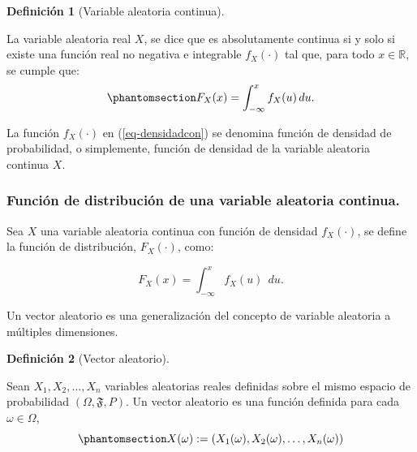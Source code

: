 \documentclass[
  us-letterpaper,
]{scrreprt}
\theoremstyle{plain}
\theoremstyle{definition}
\newtheorem{definition}{Definición}[chapter]
\theoremstyle{definition}
\theoremstyle{remark}
\begin{document}
\begin{definition}[Variable aleatoria
continua]\protect\hypertarget{def-vac}{}\label{def-vac}

La variable aleatoria real \(X\), se dice que es absolutamente continua
si y solo si existe una función real no negativa e integrable
\(f_X(\cdot)\) tal que, para todo \(x \in \mathbb{R}\), se cumple que:
\begin{equation}\phantomsection\label{eq-densidadcon}{
F_X(x) = \int_{-\infty}^{x} f_X(u) \, du.
}\end{equation}

La función \(f_X(\cdot)\) en (\ref{eq-densidadcon}) se denomina función
de densidad de probabilidad, o simplemente, función de densidad de la
variable aleatoria continua \(X\).

\end{definition}

\subsubsection{Función de distribución de una variable aleatoria
continua.}\label{funciuxf3n-de-distribuciuxf3n-de-una-variable-aleatoria-continua.}

Sea \(X\) una variable aleatoria continua con función de densidad
\(f_X (\cdot)\), se define la función de distribución, \(F_X (\cdot)\),
como:

\[
F_X (x) =  \int_{-\infty}^{x} f_X (u) \ \ du.
\]

Un vector aleatorio es una generalización del concepto de variable
aleatoria a múltiples dimensiones.

\begin{definition}[Vector
aleatorio]\protect\hypertarget{def-vectorale}{}\label{def-vectorale}

Sean \(X_1,X_2,\dots ,X_n\) variables aleatorias reales definidas sobre
el mismo espacio de probabilidad \((\Omega, \mathfrak{F}, P)\). Un
vector aleatorio es una función definida para cada
\(\omega \in \Omega\),
\begin{equation}\phantomsection\label{eq-vectora}{
X(\omega) := (X_1(\omega),X_2(\omega),\dots,X_n(\omega))
}\end{equation}

\end{definition}
\end{document}
